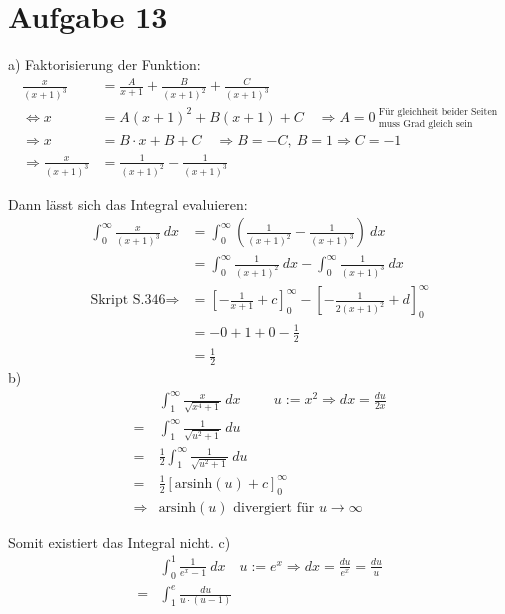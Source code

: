\documentclass[10pt]{article}
\newcommand{\arsinh}{\text{arsinh}}
\begin{document}
\thispagestyle{fancy}
\section*{Aufgabe 13}
a)
Faktorisierung der Funktion:
\begin{align*}
	\frac{x}{(x+1)^3} &=
	\frac{A}{x+1} + \frac{B}{(x+1)^2} + \frac{C}{(x+1)^3} \\
	\Leftrightarrow
	x &= 
	A (x+1)^2 + B (x+1) + C 
	\quad \Rightarrow
	A=0 \ 
	^\text{Für gleichheit beider Seiten}
	_\text{muss Grad gleich sein} \\
	\Rightarrow x &=
	B \cdot x + B + C
	\quad \Rightarrow B = -C, \ B = 1 \Rightarrow C = -1 \\
	\Rightarrow
	\frac{x}{(x+1)^3} &=
	\frac{1}{(x+1)^2} - \frac{1}{(x+1)^3}
\end{align*}

Dann lässt sich das Integral evaluieren:
\begin{align*}
	\int_0^\infty \frac{x}{(x+1)^3} \ dx
	&= 
	\int_0^\infty \left( 
	\frac{1}{(x+1)^2} - \frac{1}{(x+1)^3}
	\right)
	\ dx \\
	&= 
	\int_0^\infty \frac{1}{(x+1)^2} \ dx -
	\int_0^\infty \frac{1}{(x+1)^3} \ dx \\
	\text{Skript S.346} \Rightarrow
	&=
	\left[ -\frac{1}{x+1} + c\right]_0^\infty
	-
	\left[ -\frac1{2 (x+1)^2} + d \right]_0^\infty \\
	&= -0 + 1 + 0 - \frac12 \\
	&= \frac12
\end{align*}
b)
\begin{align*}
	&\int_1^\infty \frac{x}{\sqrt{x^4 + 1}} \ dx 
	\hspace{1cm} u:= x^2 \Rightarrow dx = \frac{du}{2x} \\
	= &\int_1^\infty \frac{1}{\sqrt{u^2 + 1}} \ du \\
	= &\frac12 \int_1^\infty \frac{1}{\sqrt{u^2 + 1}} \ du \\
	= &\frac12 \left[\arsinh(u) + c \right]_0^\infty \\
	\Rightarrow & \arsinh(u) \text{ divergiert für } u \rightarrow
	\infty
\end{align*}

Somit existiert das Integral nicht.
\newpage
\setlength{\headheight}{0cm}
c)
\begin{align*}
	&\int_0^1 \frac{1}{e^x - 1} \ dx \quad
	u := e^x \Rightarrow dx = \frac{du}{e^x} = \frac{du}{u} \\
	=& \int_1^e \frac{du}{u \cdot (u-1)} 
\end{align*}
\end{document}
